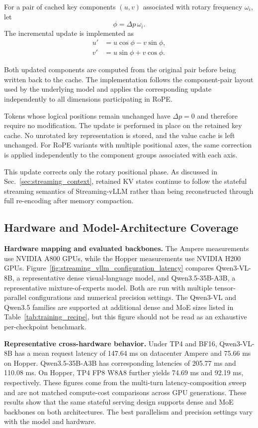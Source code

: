 For a pair of cached key components $(u,v)$ associated with rotary frequency $\omega_i$, let
\[
\phi
=
\Delta p\,\omega_i.
\]
The incremental update is implemented as
\begin{equation}
\begin{aligned}
u'
&=
u\cos\phi-v\sin\phi,\\
v'
&=
u\sin\phi+v\cos\phi.
\end{aligned}
\label{eq:rope_pairwise_update}
\end{equation}

Both updated components are computed from the original pair before being written back to the cache.
The implementation follows the component-pair layout used by the underlying model and applies the corresponding update independently to all dimensions participating in RoPE.

Tokens whose logical positions remain unchanged have $\Delta p=0$ and therefore require no modification.
The update is performed in place on the retained key cache.
No unrotated key representation is stored, and the value cache is left unchanged.
For RoPE variants with multiple positional axes, the same correction is applied independently to the component groups associated with each axis.

This update corrects only the rotary positional phase.
As discussed in Sec.~\ref{sec:streaming_context}, retained KV states continue to follow the stateful streaming semantics of Streaming-vLLM rather than being reconstructed through full re-encoding after memory compaction.

\subsection{Hardware and Model-Architecture Coverage}
\label{app:streaming_architecture}

\textbf{Hardware mapping and evaluated backbones.} The Ampere measurements use NVIDIA A800 GPUs, while the Hopper measurements use NVIDIA H200 GPUs. Figure~\ref{fig:streaming_vllm_configuration_latency} compares Qwen3-VL-8B, a representative dense visual-language model, and Qwen3.5-35B-A3B, a representative mixture-of-experts model. Both are run with multiple tensor-parallel configurations and numerical precision settings. The Qwen3-VL and Qwen3.5 families are supported at additional dense and MoE sizes listed in Table~\ref{tab:training_recipe}, but this figure should not be read as an exhaustive per-checkpoint benchmark.

\textbf{Representative cross-hardware behavior.} Under TP4 and BF16, Qwen3-VL-8B has a mean request latency of 147.64 ms on datacenter Ampere and 75.66 ms on Hopper. Qwen3.5-35B-A3B has corresponding latencies of 205.77 ms and 110.08 ms. On Hopper, TP4 FP8 W8A8 further yields 74.69 ms and 92.19 ms, respectively. These figures come from the multi-turn latency-composition sweep and are not matched compute-cost comparisons across GPU generations. These results show that the same stateful serving design supports dense and MoE backbones on both architectures. The best parallelism and precision settings vary with the model and hardware.

